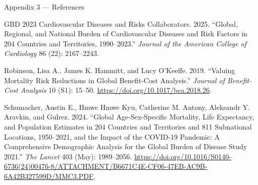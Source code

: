 \documentclass[
  ignorenonframetext,
  aspectratio=169]{beamer}
\newlength{\cslhangindent}
\newenvironment{CSLReferences}[2] %
 {\begin{list}{}{%
  \setlength{\itemindent}{0pt}
  \setlength{\leftmargin}{0pt}
  \setlength{\parsep}{0pt}
  \ifodd #1
   \setlength{\leftmargin}{\cslhangindent}
   \setlength{\itemindent}{-1\cslhangindent}
  \fi
  \setlength{\itemsep}{#2\baselineskip}}}
 {\end{list}}
\begin{document}
\begin{frame}{Appendix 3 --- References}
\label{appendix-3-references}
\scriptsize

\label{refs}
\begin{CSLReferences}{1}{0}
GBD 2023 Cardiovascular Diseases and Risks Collaborators. 2025.
{``Global, Regional, and National Burden of Cardiovascular Diseases and
Risk Factors in 204 Countries and Territories, 1990--2023.''}
\emph{Journal of the American College of Cardiology} 86 (22):
2167--2243.

Robinson, Lisa A., James K. Hammitt, and Lucy O'Keeffe. 2019. {``Valuing
Mortality Risk Reductions in Global Benefit-Cost Analysis.''}
\emph{Journal of Benefit-Cost Analysis} 10 (S1): 15--50.
\url{https://doi.org/10.1017/bca.2018.26}.

Schumacher, Austin E., Hmwe Hmwe Kyu, Catherine M. Antony, Aleksandr Y.
Aravkin, and Gulrez. 2024. {``Global Age-Sex-Specific Mortality, Life
Expectancy, and Population Estimates in 204 Countries and Territories
and 811 Subnational Locations, 1950--2021, and the Impact of the
COVID-19 Pandemic: A Comprehensive Demographic Analysis for the Global
Burden of Disease Study 2021.''} \emph{The Lancet} 403 (May):
1989--2056.
\url{https://doi.org/10.1016/S0140-6736(24)00476-8/ATTACHMENT/B6671C4E-CF06-47EB-AC9B-6A42B327599D/MMC3.PDF}.

\end{CSLReferences}
\end{frame}
\end{document}
